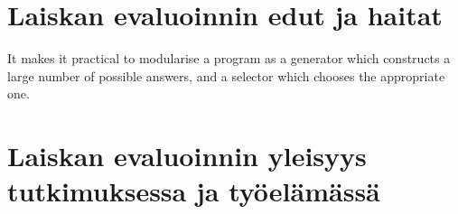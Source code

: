 

\section{Laiskan evaluoinnin edut ja haitat}

It makes it practical to modularise a program as a generator which constructs a large number of possible answers, and a selector which chooses the appropriate one.



\section{Laiskan evaluoinnin yleisyys tutkimuksessa ja työelämässä}



